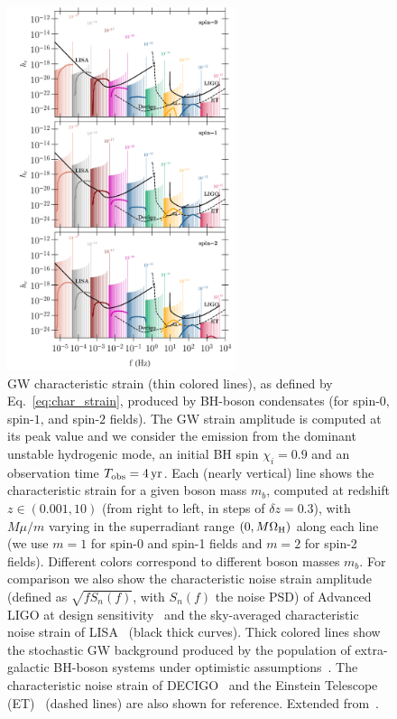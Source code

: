 \documentclass[11pt]{article}
\numberwithin{equation}{section} %
\begin{document}
%
\begin{figure}
\begin{center}
\includegraphics[width=0.6\textwidth]{strain_all_chi09_z10_withET.pdf}
\caption{GW characteristic strain (thin colored lines), as defined by Eq.~\eqref{eq:char_strain}, produced by BH-boson condensates (for spin-$0$, spin-$1$, and spin-$2$ fields). The GW strain amplitude is computed at its peak value and we consider the emission from the dominant unstable hydrogenic mode, an initial BH spin $\chi_i=0.9$ and an observation time $T_{\rm obs}=4\,{\rm yr}$. Each (nearly vertical) line shows the characteristic strain for a given boson mass $m_b$, computed at redshift $z\in(0.001,10)$ (from right to left, in steps of $\delta z=0.3$), with 
$M\mu/m$ varying in the superradiant range $(0, M\Omega_{\rm H})$ along each line (we use $m=1$ for spin-0 and spin-1 fields and $m=2$ for spin-2 fields). Different colors correspond to different boson masses $m_b$. For comparison we also show the characteristic noise strain amplitude (defined as $\sqrt{f S_n(f)}$, with $S_n(f)$ the noise PSD) of Advanced LIGO at design sensitivity~\cite{Aasi:2013wya} and the sky-averaged characteristic noise strain of LISA~\cite{Audley:2017drz,Cornish:2018dyw} (black thick curves). 
Thick colored lines show the stochastic GW background produced by the population of extra-galactic BH-boson systems under optimistic assumptions~\cite{Brito:2017wnc,Brito:2017zvb}. The characteristic noise strain of DECIGO~\cite{Kawamura:2006up} and the Einstein Telescope (ET)~\cite{Hild:2010id} (dashed lines) are also shown for reference. Extended from~\cite{Brito:2017wnc,Brito:2020lup}.  \label{sensitivity}}
\end{center}
\end{figure}
%
\end{document}

